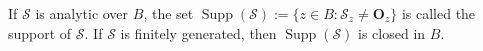 If $\mathcal{S}$ is analytic over $B$, the set $\operatorname{Supp}(\mathcal{S}) := \{z \in B : \mathcal{S}_z \neq \mathbf{O}_z\}$ is called the support of $\mathcal{S}$. If $\mathcal{S}$ is finitely generated, then $\operatorname{Supp}(\mathcal{S})$ is closed in $B$.
